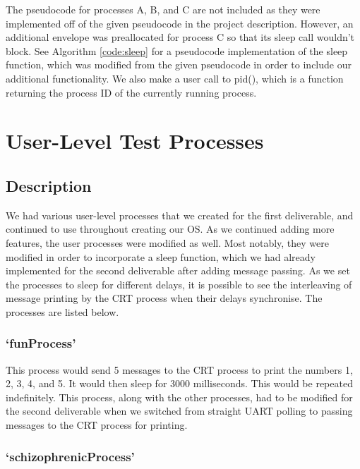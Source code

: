 \documentclass[12pt]{report}
\begin{document}
    The pseudocode for processes A, B, and C are not included as they were
    implemented off of the given pseudocode in the project description.
    However, an additional envelope was preallocated for process C so that its
    sleep call wouldn't block.  See Algorithm \ref{code:sleep} for a pseudocode
    implementation of the sleep function, which was modified from the given
    pseudocode in order to include our additional functionality.  We also make a
    user call to pid(), which is a function returning the process ID of the
    currently running process.

\chapter{User-Level Test Processes}

\section{Description}

    We had various user-level processes that we created for the first
    deliverable, and continued to use throughout creating our OS.  As we
    continued adding more features, the user processes were modified as well.
    Most notably, they were modified in order to incorporate a sleep function,
    which we had already implemented for the second deliverable after adding
    message passing.  As we set the processes to sleep for different delays, it
    is possible to see the interleaving of message printing by the CRT process
    when their delays synchronise.  The processes are listed below.

\subsection{`funProcess'}

    This process would send 5 messages to the CRT process to print the numbers
    1, 2, 3, 4, and 5.  It would then sleep for 3000 milliseconds.  This would
    be repeated indefinitely.  This process, along with the other processes, had
    to be modified for the second deliverable when we switched from straight
    UART polling to passing messages to the CRT process for printing.

\subsection{`schizophrenicProcess'}
\end{document}
